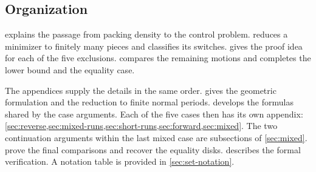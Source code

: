 \subsection{Organization}\label{sec:intro-organization}

 explains the passage from packing density to the control problem.
 reduces a minimizer to finitely many pieces and classifies its
switches.  gives the proof idea for each of the five exclusions.
 compares the remaining motions and completes the lower bound and
the equality case.

The appendices supply the details in the same order.  gives the geometric
formulation and the reduction to finite normal periods.  develops the formulas
shared by the case arguments. Each of the five cases then has its own appendix:
\cref{sec:reverse,sec:mixed-runs,sec:short-runs,sec:forward,sec:mixed}. The two continuation
arguments within the last mixed case are subsections of \cref{sec:mixed}.
 prove the final comparisons and recover the equality disks.
 describes the formal verification. A notation table is provided in
\cref{sec:set-notation}.
